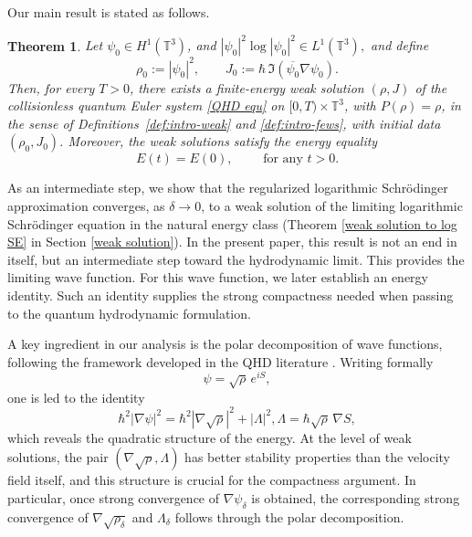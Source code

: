 \documentclass[11pt]{article}
\newtheorem{theorem}{Theorem}
\begin{document}
Our main result is stated as follows.
\begin{theorem}\label{thm:intro-main}
Let \(\psi_0\in H^1(\mathbb{T}^3)\),  and \(
|\psi_0|^2\log|\psi_0|^2\in L^1(\mathbb{T}^3),
\)
and define
\[
\rho_0:=|\psi_0|^2,
\qquad
J_0:=\hbar\,\Im(\overline{\psi_0}\nabla\psi_0).
\]
Then, for every \(T>0\), there exists a finite-energy weak solution \((\rho,J)\) of the collisionless quantum Euler system \eqref{QHD equ} on \([0,T)\times\mathbb{T}^3\), with $P(\rho)=\rho$,  in the sense of Definitions~\ref{def:intro-weak} and \ref{def:intro-fews}, with initial data \((\rho_0,J_0)\).  Moreover, the weak solutions satisfy the energy equality
\[
E(t)=E(0), \qquad\text{ for any }  t>0.
\]

\end{theorem}

 
 
 
 
 
 
 
 
 
 As an intermediate step, we show that the regularized logarithmic Schr\"odinger approximation converges, as $\delta \to 0$, to a weak solution of the limiting logarithmic Schr\"odinger equation in the natural energy class (Theorem \ref{weak solution to log SE} in Section \ref{weak solution}). In the present paper,
 this result is not an end in itself, but an intermediate step toward the hydrodynamic limit.
This provides the limiting wave function. For this wave function, we later establish an energy identity. Such an identity  supplies the strong compactness needed when passing to the quantum hydrodynamic formulation.
\medskip

A key ingredient in our analysis is the polar decomposition of wave functions, following the framework developed in the QHD literature \cite{AntonelliMarcati2009, AntonelliMarcati2012}. Writing formally
\[
\psi=\sqrt{\rho}\,e^{iS},
\]
one is led to the identity
\[
\hbar^2|\nabla\psi|^2=\hbar^2|\nabla\sqrt{\rho}|^2+|\Lambda|^2,
\Lambda=\hbar\sqrt{\rho}\,\nabla S,
\]
which reveals the quadratic structure of the energy. At the level of weak solutions, the pair $(\nabla\sqrt{\rho},\Lambda)$ has better stability properties than the velocity field itself, and this structure is crucial for the compactness argument. In particular, once strong convergence of $\nabla\psi_\delta$ is obtained, the corresponding strong convergence of $\nabla\sqrt{\rho_\delta}$ and $\Lambda_\delta$ follows through the polar decomposition.


\medskip
\end{document}
